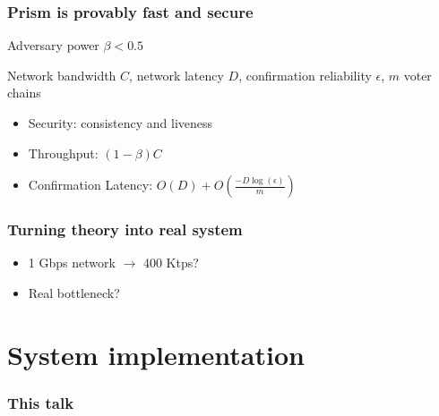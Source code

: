 \documentclass[aspectratio=169]{beamer}
\begin{document}
\begin{frame}
    \frametitle{Prism is provably fast and secure}
    Adversary power $\beta < 0.5$

    Network bandwidth $C$, network latency $D$, confirmation reliability $\epsilon$, $m$ voter chains

    \begin{itemize}
        \item \alert{Security}: consistency and liveness
            \pause
        \item \alert{Throughput}: $(1-\beta)C$
            \pause
        \item \alert{Confirmation Latency}: $O\left(D\right) + O\left(\frac{-D\log\left(\epsilon\right)}{m}\right)$
    \end{itemize}
\end{frame}

\begin{frame}
    \frametitle{Turning theory into real system}
    \begin{itemize}
            \pause
        \item 1 Gbps network $\rightarrow$ 400 Ktps?
            \pause
        \item Real bottleneck?
    \end{itemize}
\end{frame}



\section{System implementation}

\begin{frame}
    \frametitle{This talk}
\end{frame}
\end{document}

